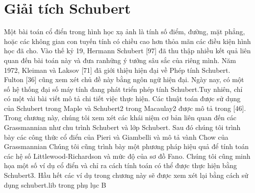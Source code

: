 \documentclass[11pt,a4paper]{book}
\begin{document}
\chapter{Giải tích Schubert}
Một bài toán cổ điển trong hình học xạ ảnh là tính số điểm, đường, mặt phẳng, hoặc các không gian con tuyến tính có chiều cao hơn thỏa mãn các điều kiện hình học đã cho. Vào thế kỷ 19, Hermann Schubert [97] đã thu thập nhiều kết quả liên quan đến bài toán này và đưa ranhững ý tưởng sâu sắc của riêng mình. Năm 1972, Kleiman và Laksov [71] đã giới thiệu hiện đại về Phép tính Schubert. Fulton [36] cũng xem xét chủ đề này bằng ngôn ngữ hiện đại. Ngày nay, có một số hệ thống đại số máy tính đang phát triển phép tính Schubert.Tuy nhiên, chỉ có một vài bài viết mô tả chi tiết việc thực hiện. Các thuật toán được sử dụng của Schubert trong Maple và Schubert2 trong Macaulay2 được mô tả trong [46]. Trong chương này, chúng tôi xem xét các khái niệm cơ bản liên quan đến các Grassmannian như chu trình Schubert và lớp Schubert. Sau đó chúng tôi trình bày các công thức cổ điển của Pieri và Giambelli và mô tả vành Chow của Grassmannian Chúng tôi cũng trình bày một phương pháp hiệu quả để tính toán các hệ số Littlewood-Richardson và mức độ của sơ đồ Fano. Chúng tôi cũng minh họa một số ví dụ cổ điển và chỉ ra cách tính toán có thể được thực hiện bằng Schubert3. Hầu hết các ví dụ trong chương này sẽ được xem xét lại bằng cách sử dụng schubert.lib trong phụ lục B
\end{document}
